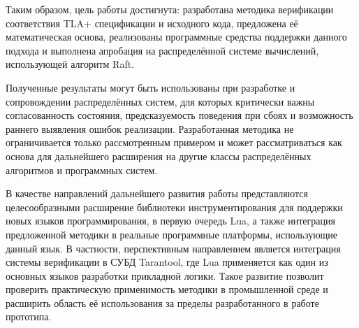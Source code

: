 Таким образом, цель работы достигнута: разработана методика
верификации соответствия TLA+ спецификации и исходного кода,
предложена её математическая основа, реализованы программные
средства поддержки данного подхода и выполнена апробация на
распределённой системе вычислений, использующей алгоритм Raft.

Полученные результаты могут быть использованы при разработке и
сопровождении распределённых систем, для которых критически важны
согласованность состояния, предсказуемость поведения при сбоях и
возможность раннего выявления ошибок реализации. Разработанная
методика не ограничивается только рассмотренным примером и может
рассматриваться как основа для дальнейшего расширения на другие
классы распределённых алгоритмов и программных систем.

В качестве направлений дальнейшего развития работы представляются
целесообразными расширение библиотеки инструментирования для
поддержки новых языков программирования, в первую очередь Lua, а
также интеграция предложенной методики в реальные программные
платформы, использующие данный язык. В частности, перспективным
направлением является интеграция системы верификации в СУБД
Tarantool, где Lua применяется как один из основных языков
разработки прикладной логики. Такое развитие позволит проверить
практическую применимость методики в промышленной среде и
расширить область её использования за пределы разработанного в
работе прототипа.

